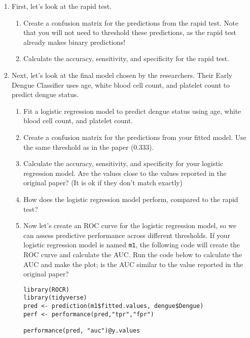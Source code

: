 \documentclass[11pt]{article}
\begin{document}
\begin{enumerate}
\item First, let's look at the rapid test. 

\begin{enumerate}
\item Create a confusion matrix for the predictions from the rapid test. Note that you will not need to threshold these predictions, as the rapid test already makes binary predictions!

\item Calculate the accuracy, sensitivity, and specificity for the rapid test.
\end{enumerate}

\item Next, let's look at the final model chosen by the researchers. Their Early Dengue Classifier uses age, white blood cell count, and platelet count to predict dengue status. 

\begin{enumerate}
\item Fit a logistic regression model to predict dengue status using age, white blood cell count, and platelet count.

\item Create a confusion matrix for the predictions from your fitted model. Use the same threshold as in the paper (0.333).

\item Calculate the accuracy, sensitivity, and specificity for your logistic regression model. Are the values close to the values reported in the original paper? (It is ok if they don't match exactly)

\item How does the logistic regression model perform, compared to the rapid test?

\item Now let's create an ROC curve for the logistic regression model, so we can assess predictive performance across different thresholds. If your logistic regression model is named \verb;m1;, the following code will create the ROC curve and calculate the AUC. Run the code below to calculate the AUC and make the plot; is the AUC similar to the value reported in the original paper?

\begin{verbatim}
library(ROCR)
library(tidyverse)
pred <- prediction(m1$fitted.values, dengue$Dengue)
perf <- performance(pred,"tpr","fpr")

performance(pred, "auc")@y.values 


\end{verbatim}
\end{enumerate}
\end{enumerate}
\end{document}
